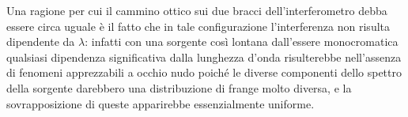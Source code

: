 Una ragione per cui il cammino ottico sui due bracci dell'interferometro debba essere circa uguale è 
il fatto che in tale configurazione l'interferenza non risulta
dipendente da $\lambda$: infatti con una sorgente così lontana
dall'essere monocromatica qualsiasi dipendenza significativa dalla
lunghezza d'onda risulterebbe nell'assenza di fenomeni apprezzabili a occhio nudo
poiché le diverse componenti dello spettro della sorgente darebbero una distribuzione di frange
molto diversa, e la sovrapposizione di queste apparirebbe essenzialmente uniforme.